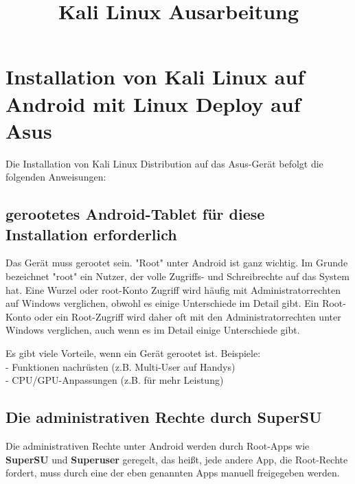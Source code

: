 \documentclass[11pt,a4paper]{article}
\begin{document}
\begin{titlepage}
\begin{figure}
\centering
\end{figure}
\title{Kali Linux Ausarbeitung}
\date{}

\maketitle
\end{titlepage}

\newpage

\section {Installation von Kali Linux auf Android mit Linux Deploy auf Asus}

Die Installation von Kali Linux Distribution auf das  Asus-Gerät befolgt die folgenden Anweisungen:

\subsection{gerootetes Android-Tablet für diese Installation erforderlich}
Das Gerät muss gerootet sein.
"Root" unter Android ist ganz wichtig.
Im Grunde bezeichnet "root" ein Nutzer, der volle Zugriffs- und Schreibrechte auf das System hat. Eine Wurzel oder root-Konto Zugriff wird häufig mit Administratorrechten auf Windows verglichen, obwohl es einige Unterschiede im Detail gibt. Ein Root-Konto oder ein Root-Zugriff wird daher oft mit den Administratorrechten unter Windows verglichen, auch wenn es im Detail einige Unterschiede gibt.

Es gibt viele Vorteile, wenn ein Gerät gerootet ist. Beispiele: \\
- Funktionen nachrüsten (z.B. Multi-User auf Handys) \\
- CPU/GPU-Anpassungen (z.B. für mehr Leistung)  \\


\subsection{Die administrativen Rechte durch SuperSU}
Die administrativen Rechte unter Android werden durch Root-Apps wie \textbf{SuperSU} und \textbf{Superuser} geregelt, das heißt, jede andere App, die Root-Rechte fordert, muss durch eine der eben genannten Apps manuell freigegeben werden. \\
\end{document}
